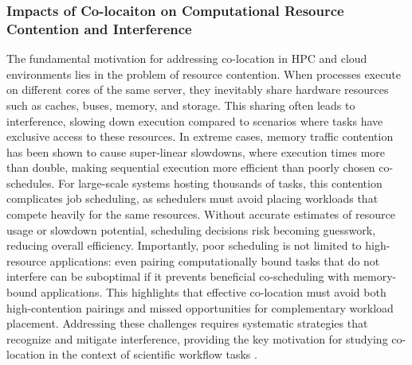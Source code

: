 \subsubsection{Impacts of Co-locaiton on Computational Resource Contention and Interference}
\label{sec:background_colocation_interference}
The fundamental motivation for addressing co-location in HPC and cloud environments lies in the problem of resource contention. When processes execute on different cores of the same server, they inevitably share hardware resources such as caches, buses, memory, and storage. This sharing often leads to interference, slowing down execution compared to scenarios where tasks have exclusive access to these resources. In extreme cases, memory traffic contention has been shown to cause super-linear slowdowns, where execution times more than double, making sequential execution more efficient than poorly chosen co-schedules. For large-scale systems hosting thousands of tasks, this contention complicates job scheduling, as schedulers must avoid placing workloads that compete heavily for the same resources. Without accurate estimates of resource usage or slowdown potential, scheduling decisions risk becoming guesswork, reducing overall efficiency. Importantly, poor scheduling is not limited to high-resource applications: even pairing computationally bound tasks that do not interfere can be suboptimal if it prevents beneficial co-scheduling with memory-bound applications. This highlights that effective co-location must avoid both high-contention pairings and missed opportunities for complementary workload placement. Addressing these challenges requires systematic strategies that recognize and mitigate interference, providing the key motivation for studying co-location in the context of scientific workflow tasks \cite{inproceedings}.


